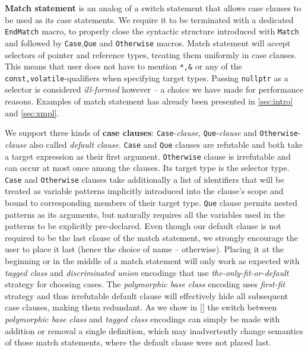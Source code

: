 \documentclass[preprint]{sigplanconf}
\makeatletter
\DeclareRobustCommand{\code}[1]{{\lstinline[breaklines=false,escapechar=@]{#1}}}
\makeatother
\begin{document}
\noindent                           
{\bf Match statement} is an analog of a switch statement that allows case 
clauses to be used as its case statements. We require it to be terminated with a 
dedicated \code{EndMatch} macro, to properly close the syntactic structure 
introduced with \code{Match} and followed by \code{Case},\code{Que} and 
\code{Otherwise} macros. Match statement will accept selectors of pointer and 
reference types, treating them uniformly in case clauses. This means that user 
does not have to mention \code{*,&} or any of the \code{const,volatile}-qualifiers
when specifying target types. Passing \code{nullptr} as a selector is considered 
\emph{ill-formed} however -- a choice we have made for performance reasons. 
Examples of match statement has already been presented in 
\textsection\ref{sec:intro} and \textsection\ref{sec:xmpl}.

We support three kinds of {\bf case clauses}: \code{Case}-\emph{clause}, 
\code{Que}-\emph{clause} and \code{Otherwise}-\emph{clause} also called 
\emph{default clause}. \code{Case} and \code{Que} clauses are refutable and both 
take a target expression as their first argument. \code{Otherwise} clause is 
irrefutable and can occur at most once among the clauses. Its target type is 
the selector type. \code{Case} and \code{Otherwise} clauses take additionally a 
list of identifiers that will be treated as variable patterns implicitly 
introduced into the clause's scope and bound to corresponding members of their 
target type. \code{Que} clause permits nested patterns as its arguments, but 
naturally requires all the variables used in the patterns to be explicitly 
pre-declared. Even though our default clause is not required to be the last 
clause of the match statement, we strongly encourage the user to place it 
last (hence the choice of name -- otherwise). Placing it at the beginning or in 
the middle of a match statement will only work as expected with \emph{tagged 
class} and \emph{discriminated union} encodings that use 
\emph{the-only-fit-or-default} strategy for choosing cases. The 
\emph{polymorphic base class} encoding uses \emph{first-fit} strategy and thus 
irrefutable default clause will effectively hide all subsequent case 
clauses, making them redundant. As we show in \textsection\ref{} the switch 
between \emph{polymorphic base class} and \emph{tagged class} encodings can 
simply be made with addition or removal a single definition, which may 
inadvertently change semantics of those match statements, where the default 
clause were not placed last.
\end{document}
